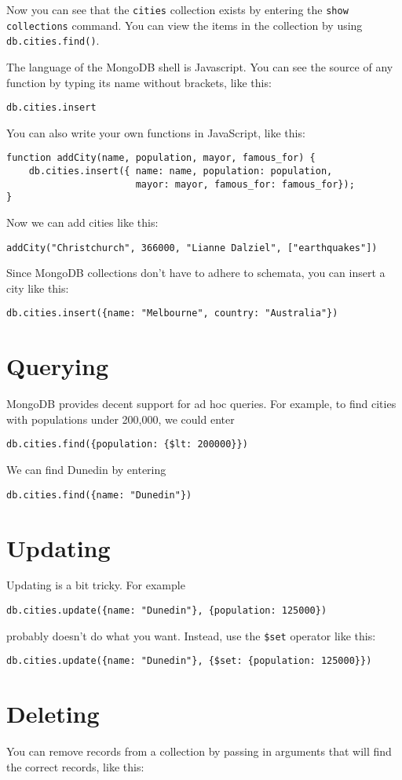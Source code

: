 \documentclass{article}
\begin{document}
Now you can see that the \texttt{cities} collection exists by entering the \texttt{show collections} command.  You can view the items in the collection by using \texttt{db.cities.find()}.

The language of the MongoDB shell is Javascript.  You can see the source of any function by typing its name without brackets, like this:

\texttt{db.cities.insert}

You can also write your own functions in JavaScript, like this:

\begin{verbatim}
function addCity(name, population, mayor, famous_for) {
    db.cities.insert({ name: name, population: population, 
                       mayor: mayor, famous_for: famous_for});
}
\end{verbatim}

Now we can add cities like this:

\texttt{addCity("Christchurch", 366000, "Lianne Dalziel", ["earthquakes"]) }

Since MongoDB collections don't have to adhere to schemata, you can insert a
city like this:

\texttt{db.cities.insert(\{name: "Melbourne", country: "Australia"\})}

\section{Querying}
MongoDB provides decent support for ad hoc queries.  For example, to find 
cities with populations under 200,000, we could enter

\texttt{db.cities.find(\{population: \{\$lt: 200000\}\})}

We can find Dunedin by entering

\texttt{db.cities.find(\{name: "Dunedin"\})}

\section{Updating}
Updating is a bit tricky.  For example


\texttt{db.cities.update(\{name: "Dunedin"\}, \{population: 125000\})}

probably doesn't do what you want.  Instead, use the \texttt{\$set} operator like this:


\texttt{db.cities.update(\{name: "Dunedin"\}, \{\$set: \{population: 125000\}\})}

\section{Deleting}
You can remove records from a collection by passing in arguments that will find the correct records, like this:
\end{document}
